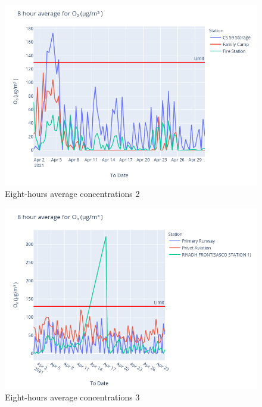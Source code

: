\documentclass[12pt, oneside]{book}
\begin{document}
{
{\begin{figure}[H]
\centering
\includegraphics[width=\textwidth]{image196}
\caption{Eight-hours average  concentrations 2}\label{image196}
\end{figure}}{}

{\begin{figure}[H]
\centering
\includegraphics[width=\textwidth]{image208}
\caption{Eight-hours average  concentrations 3}\label{image208}
\end{figure}}{}

}
\end{document}
